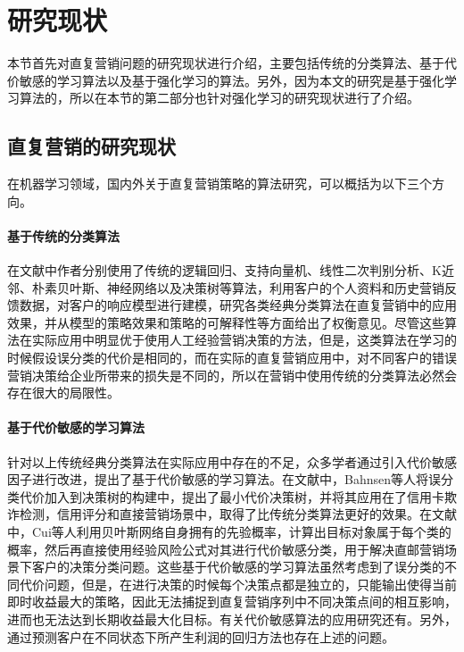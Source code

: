 \section{研究现状}
本节首先对直复营销问题的研究现状进行介绍，主要包括传统的分类算法、基于代价敏感的学习算法以及基于强化学习的算法。另外，因为本文的研究是基于强化学习算法的，所以在本节的第二部分也针对强化学习的研究现状进行了介绍。

\subsection{直复营销的研究现状}
在机器学习领域，国内外关于直复营销策略的算法研究，可以概括为以下三个方向。

\paragraph{基于传统的分类算法}

在文献\citep{alam2012actionable, mitik2017data, wong2005mining, coussement2015improving}中作者分别使用了传统的逻辑回归、支持向量机、线性二次判别分析、K近邻、朴素贝叶斯、神经网络以及决策树等算法，利用客户的个人资料和历史营销反馈数据，对客户的响应模型进行建模，研究各类经典分类算法在直复营销中的应用效果，并从模型的策略效果和策略的可解释性等方面给出了权衡意见。尽管这些算法在实际应用中明显优于使用人工经验营销决策的方法，但是，这类算法在学习的时候假设误分类的代价是相同的，而在实际的直复营销应用中，对不同客户的错误营销决策给企业所带来的损失是不同的，所以在营销中使用传统的分类算法必然会存在很大的局限性。

\paragraph{基于代价敏感的学习算法}
针对以上传统经典分类算法在实际应用中存在的不足，众多学者通过引入代价敏感因子进行改进，提出了基于代价敏感的学习算法。在文献\citep{bahnsen2015example}中，Bahnsen等人将误分类代价加入到决策树的构建中，提出了最小代价决策树，并将其应用在了信用卡欺诈检测，信用评分和直接营销场景中，取得了比传统分类算法更好的效果。在文献\citep{cui2012cost}中，Cui等人利用贝叶斯网络自身拥有的先验概率，计算出目标对象属于每个类的概率，然后再直接使用经验风险公式对其进行代价敏感分类，用于解决直邮营销场景下客户的决策分类问题。这些基于代价敏感的学习算法虽然考虑到了误分类的不同代价问题，但是，在进行决策的时候每个决策点都是独立的，只能输出使得当前即时收益最大的策略，因此无法捕捉到直复营销序列中不同决策点间的相互影响，进而也无法达到长期收益最大化目标。有关代价敏感算法的应用研究还有\citep{migueis2017predicting,zakaryazad2016profit,hu2015cost}。另外，通过预测客户在不同状态下所产生利润的回归方法也存在上述的问题。

